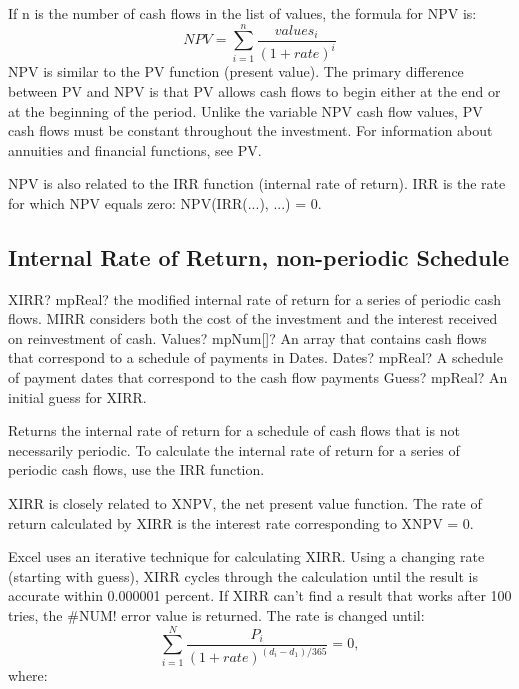 If n is the number of cash flows in the list of values, the formula for NPV is: 
\begin{equation}
NPV = \sum_{i=1}^n \frac{values_i}{(1+rate)^i}
\end{equation}
NPV is similar to the PV function (present value). The primary difference between PV and NPV is that PV allows cash flows to begin either at the end or at the beginning of the period. Unlike the variable NPV cash flow values, PV cash flows must be constant throughout the investment. For information about annuities and financial functions, see PV.

NPV is also related to the IRR function (internal rate of return). IRR is the rate for which NPV equals zero: NPV(IRR(...), ...) = 0.





\subsection{Internal Rate of Return, non-periodic Schedule}

\begin{mpFunctionsExtract}
	\mpWorksheetFunctionThreeNotImplemented
	{XIRR? mpReal? the modified internal rate of return for a series of periodic cash flows. MIRR considers both the cost of the investment and the interest received on reinvestment of cash.}
	{Values? mpNum[]? An array that contains cash flows that correspond to a schedule of payments in Dates.}
	{Dates? mpReal? A schedule of payment dates that correspond to the cash flow payments}
	{Guess? mpReal? An initial guess for XIRR.}
\end{mpFunctionsExtract}

\vspace{0.3cm}
Returns the internal rate of return for a schedule of cash flows that is not necessarily periodic. To calculate the internal rate of return for a series of periodic cash flows, use the IRR function.

XIRR is closely related to XNPV, the net present value function. The rate of return calculated by XIRR is the interest rate corresponding to XNPV = 0.

Excel uses an iterative technique for calculating XIRR. Using a changing rate (starting with guess), XIRR cycles through the calculation until the result is accurate within 0.000001 percent. If XIRR can't find a result that works after 100 tries, the \#NUM! error value is returned. The rate is changed until: 
\begin{equation}
\sum_{i=1}^N \frac{P_i}{(1+rate)^{(d_i-d_1)/365}} = 0,
\end{equation}
where:

